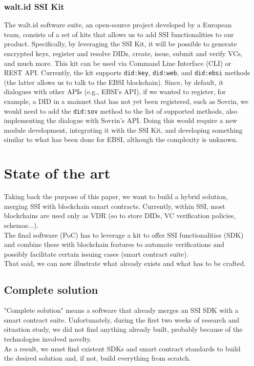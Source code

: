 \subsubsection{walt.id SSI Kit}
The walt.id\cite{site:waltid} software suite, an open-source project developed by a European team, 
consists of a set of kits that allows us to add SSI functionalities to our product. 
Specifically, by leveraging the SSI Kit\cite{site:ssikit}, it will be possible to generate encrypted 
keys, register and resolve DIDs, create, issue, submit and verify VCs, and much more. 
This kit can be used via Command Line Interface (CLI) or REST API. Currently, the 
kit supports \texttt{did:key}, \texttt{did:web}, and \texttt{did:ebsi} methods (the 
latter allows us to talk to the EBSI blockchain). Since, by default, it dialogues with 
other APIs (e.g., EBSI's API), if we wanted to register, for example, a DID in a 
mainnet that has not yet been registered, such as Sovrin, we would need to add the 
\texttt{did:sov} method to the list of supported methods, also implementing the 
dialogue with Sovrin's API. Doing this would require a new module development, 
integrating it with the SSI Kit, and developing something similar to what has been 
done for EBSI, although the complexity is unknown.
\section{State of the art}
Taking back the purpose of this paper, we want to build a hybrid solution, merging SSI 
with blockchain smart contracts. Currently, within SSI, most blockchains are used only 
as VDR (so to store DIDs, VC verification policies, schemas...).\\
The final software (PoC) has to leverage a kit to offer SSI functionalities (SDK) and 
combine these with blockchain features to automate verifications and possibly 
facilitate certain issuing cases (smart contract suite).\\
That said, we can now illustrate what already exists and what has to be crafted.
\subsection{Complete solution}
"Complete solution" means a software that already merges an SSI SDK with a smart 
contract suite. Unfortunately, during the first two weeks of research and situation 
study, we did not find anything already built, probably because of the technologies 
involved novelty.\\
As a result, we must find existent SDKs and smart contract standards to build the 
desired solution and, if not, build everything from scratch.

